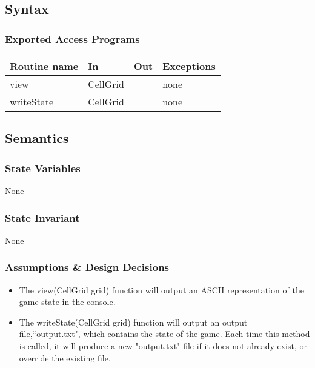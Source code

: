 \documentclass[12pt]{article}
\begin{document}
\subsection* {Syntax}

\subsubsection* {Exported Access Programs}

\begin{tabular}{| l | l | l | l |}
\hline
\textbf{Routine name} & \textbf{In} & \textbf{Out} & \textbf{Exceptions}\\
\hline
view  & CellGrid & & none\\
\hline
writeState & CellGrid & & none\\
\hline
\end{tabular}

\subsection* {Semantics}

\subsubsection* {State Variables}

None

\subsubsection* {State Invariant}

None
\subsubsection* {Assumptions \& Design Decisions}

\begin{itemize}

\item The view(CellGrid grid) function will output an ASCII representation of the game state in the console.

\item The writeState(CellGrid grid) function will output an output file,``output.txt", which contains the state of the game. Each time this method is called, it will produce a new "output.txt" file if it does not already exist, or override the existing file.

\end{itemize}
\end{document}
